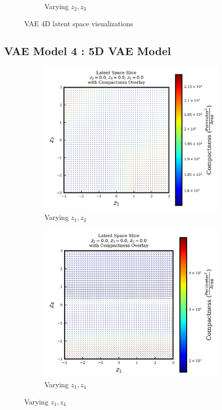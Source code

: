 \documentclass{article}
\begin{document}
\begin{figure}[H]
\begin{subfigure}{0.45\textwidth}
        \caption{Varying $z_2, z_3$}
    \end{subfigure}
    \caption{VAE 4D latent space visualizations}
\end{figure}


\subsection{VAE Model 4 : 5D VAE Model}\label{model4_appendix}

\begin{figure}[H]
    \centering
    \begin{subfigure}{0.45\textwidth}
        \includegraphics[width=\linewidth]{figures/VAEmodels/model4/varying_z1_z3_fixed_z2=0.0_z4=0.0_z5=0.0.png}
        \caption{Varying $z_1, z_3$}
    \end{subfigure}
    \hfill
    \begin{subfigure}{0.45\textwidth}
        \includegraphics[width=\linewidth]{figures/VAEmodels/model4/varying_z1_z4_fixed_z2=0.0_z3=0.0_z5=0.0.png}
        \caption{Varying $z_1, z_4$}
    \end{subfigure}
    

\end{figure}
\end{document}
